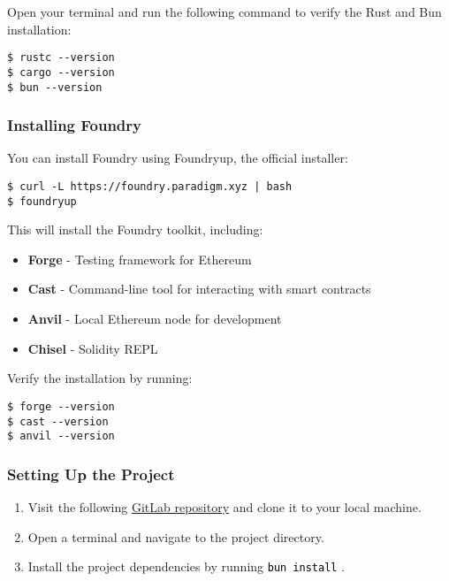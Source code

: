 \documentclass[12pt]{article}
\newcommand{\codegrey}[1]{%
  \texttt{\colorbox{black!4}{\textcolor{black}{#1}}}%
}
\begin{document}
\noindent
Open your terminal and run the following command to verify the Rust and Bun installation:

\begin{verbatim}
$ rustc --version
$ cargo --version
$ bun --version
\end{verbatim}

\subsubsection*{Installing Foundry}
You can install Foundry using Foundryup, the official installer:

\begin{verbatim}
$ curl -L https://foundry.paradigm.xyz | bash
$ foundryup
\end{verbatim}

\noindent
This will install the Foundry toolkit, including:
\begin{itemize}
    \item \textbf{Forge} - Testing framework for Ethereum
    \item \textbf{Cast} - Command-line tool for interacting with smart contracts
    \item \textbf{Anvil} - Local Ethereum node for development
    \item \textbf{Chisel} - Solidity REPL
\end{itemize}

\noindent
Verify the installation by running:

\begin{verbatim}
$ forge --version
$ cast --version
$ anvil --version
\end{verbatim}

\subsubsection*{Setting Up the Project}

\begin{enumerate}
    \item Visit the following \href{ttps://gitlab.fel.cvut.cz/radovluk/smart-contracts-exercises/-/tree/foundry/09-Vulnerabilities-Detection/task/task-code}{GitLab repository} and clone it to your local machine.
    \item Open a terminal and navigate to the project directory.
    \item Install the project dependencies by running \codegrey{bun install}.
\end{enumerate}
\end{document}
